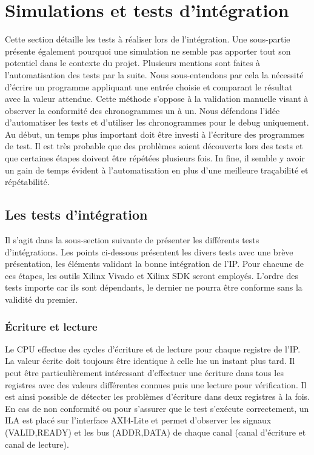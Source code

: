 \section{Simulations et tests d'intégration}
Cette section détaille les tests à réaliser lors de l'intégration.
Une sous-partie présente également pourquoi une simulation ne semble pas apporter tout son potentiel dans le contexte du projet.
Plusieurs mentions sont faites à l'automatisation des tests par la suite.
Nous sous-entendons par cela la nécessité d'écrire un programme appliquant une entrée choisie et comparant le résultat avec la valeur attendue.
Cette méthode s'oppose à la validation manuelle visant à observer la conformité des chronogrammes un à un.
Nous défendons l'idée d'automatiser les tests et d'utiliser les chronogrammes pour le debug uniquement.
Au début, un temps plus important doit être investi à l'écriture des programmes de test.
Il est très probable que des problèmes soient découverts lors des tests et que certaines étapes doivent être répétées plusieurs fois.
In fine, il semble y avoir un gain de temps évident à l'automatisation en plus d'une meilleure traçabilité et répétabilité.


\subsection{Les tests d'intégration}

Il s'agit dans la sous-section suivante de présenter les différents tests d'intégrations.
Les points ci-dessous présentent les divers tests avec une brève présentation, les éléments validant la bonne intégration de l'IP.
Pour chacune de ces étapes, les outils Xilinx Vivado et Xilinx SDK seront employés.
L'ordre des tests importe car ils sont dépendants, le dernier ne pourra être conforme sans la validité du premier.

\subsubsection*{Écriture et lecture}

Le CPU effectue des cycles d'écriture et de lecture pour chaque registre de l'IP.
La valeur écrite doit toujours être identique à celle lue un instant plus tard.
Il peut être particulièrement intéressant d'effectuer une écriture dans tous les registres avec des valeurs différentes connues puis une lecture pour vérification.
Il est ainsi possible de détecter les problèmes d'écriture dans deux registres à la fois.
En cas de non conformité ou pour s'assurer que le test s'exécute correctement, un ILA est placé sur l'interface AXI4-Lite et permet d'observer les signaux (VALID,READY) et les bus (ADDR,DATA) de chaque canal (canal d'écriture et canal de lecture).

